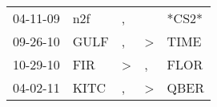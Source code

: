 \begin{supertabular}{lllll}
 04-11-09 &   n2f &             , &               &  *CS2* \\
 09-26-10 &  GULF &             , &  \textgreater &   TIME \\
 10-29-10 &   FIR &  \textgreater &             , &   FLOR \\
 04-02-11 &  KITC &             , &  \textgreater &   QBER \\
\end{supertabular}
